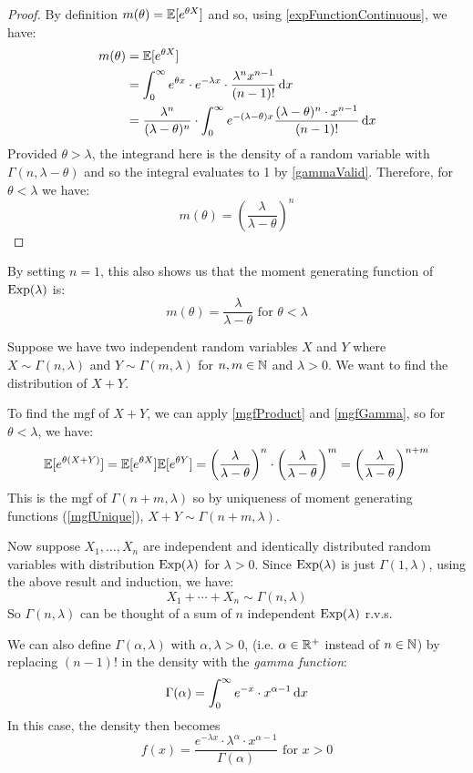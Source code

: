 \documentclass[../main.tex]{subfiles}
\begin{document}
\begin{proof}
  By definition $m(\theta) = \mathbb{E}[e^{\theta X}]$ and so, using \cref{expFunctionContinuous}, we have:
  \begin{align*}
    m(\theta) &= \E[e^{\theta X}] \\
              &= \int_{0}^{\infty} e^{\theta x} \cdot e^{-\lambda x} \cdot \frac{\lambda^{n} x^{n - 1}}{(n - 1)!} \d{x} \\
              &= \frac{\lambda^{n}}{(\lambda - \theta)^{n}} \cdot \int_{0}^{\infty} e^{-(\lambda - \theta)x} \frac{(\lambda - \theta)^{n} \cdot x^{n - 1}}{(n - 1)!} \d{x}  \\
  \end{align*}
  Provided $\theta > \lambda$, the integrand here is the density of a random variable with $\Gamma(n, \lambda - \theta)$ and so the integral evaluates to 1 by \cref{gammaValid}.
  Therefore, for $\theta < \lambda$ we have:
  \[
    m(\theta) = \left(\frac{\lambda}{\lambda - \theta}\right)^{n}
  \]
\end{proof}
\begin{remark}
  By setting $n = 1$, this also shows us that the moment generating function of $\operatorname{Exp}(\lambda)$ is:
  \[
    m(\theta) = \frac{\lambda}{\lambda - \theta} \text{ for } \theta < \lambda
  \]
\end{remark}
\begin{example}
  Suppose we have two independent random variables $X$ and $Y$ where $X \sim \Gamma(n, \lambda)$ and $Y \sim \Gamma(m, \lambda)$ for $n, m \in \mathbb{N}$ and $\lambda > 0$.
  We want to find the distribution of $X + Y$.

  To find the mgf of $X + Y$, we can apply \cref{mgfProduct} and \cref{mgfGamma}, so for $\theta < \lambda$, we have:
  \[
    \mathbb{E}[e^{\theta(X + Y)}] = \mathbb{E}[e^{\theta X}] \mathbb{E}[e^{\theta Y}] = \left(\frac{\lambda}{\lambda - \theta}\right)^{n} \cdot \left(\frac{\lambda}{\lambda - \theta}\right)^{m} = \left(\frac{\lambda}{\lambda - \theta}\right)^{n + m}
  \]
  This is the mgf of $\Gamma(n + m, \lambda)$ so by uniqueness of moment generating functions (\cref{mgfUnique}), $X + Y \sim \Gamma(n + m, \lambda)$.

  Now suppose $X_1, \ldots, X_n$ are independent and identically distributed random variables with distribution $\operatorname{Exp}(\lambda)$ for $\lambda > 0$.
  Since $\operatorname{Exp}(\lambda)$ is just $\Gamma(1, \lambda)$, using the above result and induction, we have:
  \[
    X_1 + \cdots + X_n \sim \Gamma(n, \lambda)
  \]
  So $\Gamma(n, \lambda)$ can be thought of a sum of $n$ independent $\operatorname{Exp}(\lambda)$ r.v.s.
\end{example}
\begin{remark}
  \nonexaminable
  We can also define $\Gamma(\alpha,\lambda)$ with $\alpha, \lambda > 0$, (i.e. $\alpha \in \mathbb{R}^{+}$ instead of $n \in \mathbb{N}$) by replacing $(n - 1)!$ in the density with the \textit{gamma function}:
  \[
    \Gamma(\alpha) = \int_{0}^{\infty} e^{-x} \cdot x^{\alpha - 1} \d{x}
  \]
  In this case, the density then becomes
  \[
    f(x) = \frac{e^{-\lambda x} \cdot \lambda^{\alpha} \cdot x^{\alpha - 1}}{\Gamma(\alpha)} \text{ for $x > 0$}
  \]
\end{remark}
\end{document}
